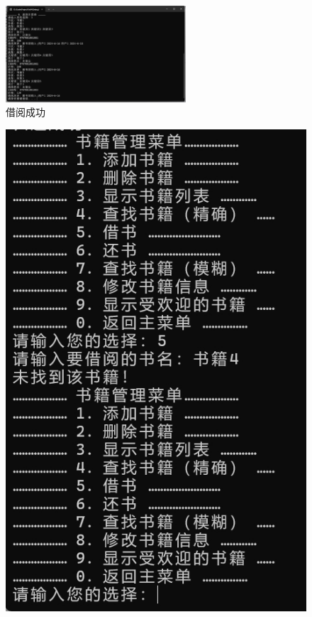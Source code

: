 \documentclass[12pt,twoside]{ctexart}
\begin{document}
\begin{figure}[H]
    \centering
    \includegraphics[width=0.6\textwidth]{Book/borrowinginfo.png}
    \caption{借阅成功}
    \label{fig:ModifySuccess}
\end{figure}


\begin{figure}[H]
    \centering
    \begin{minipage}{0.48\textwidth}
        \centering
        \includegraphics[width=\textwidth]{Book/borrowsearchfail.png}

\end{minipage}
\end{figure}
\end{document}
